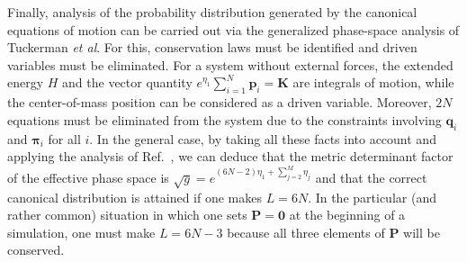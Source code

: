 \documentclass[aip,jcp,reprint,amsmath,amssymb]{revtex4-1}
\newcommand{\vt}[1]{\boldsymbol{\mathbf{#1}}}           %
\begin{document}
Finally, analysis of the probability distribution generated by the canonical equations of motion can be carried out via the generalized phase-space analysis of Tuckerman \textit{et al}.\cite{Tuckerman2001} For this, conservation laws must be identified and driven variables must be eliminated. For a system without external forces, the extended energy $H$ and the vector quantity $e^{\eta_1}\sum_{i=1}^N {\vt p}_i = \vt K$ are integrals of motion, while the center-of-mass position can be considered as a driven variable.\cite{Tuckerman2001} Moreover, $2N$ equations must be eliminated from the system due to the constraints involving $\vt q_i$ and $\vt \pi_i$ for all $i$. In the general case, by taking all these facts into account and applying the analysis of Ref.~, we can deduce that the metric determinant factor of the effective phase space is $\sqrt{g} = e^{(6N-2) \eta_1 + \sum_{j=2}^M \eta_j}$ and that the correct canonical distribution is attained if one makes $L = 6N$. In the particular (and rather common) situation in which one sets $\vt P = \vt 0$ at the beginning of a simulation, one must make $L = 6N - 3$ because all three elements of $\vt P$ will be conserved.\cite{Martyna1994}
\end{document}
